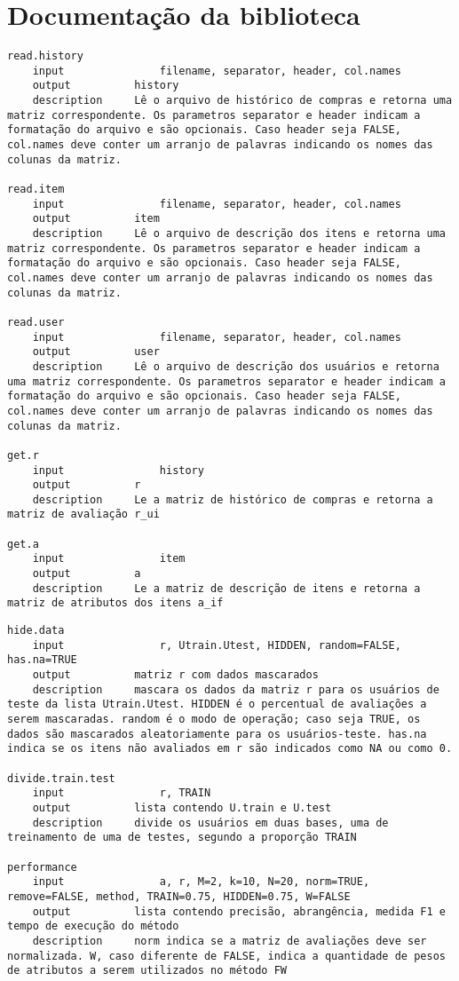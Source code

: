 \chapter{Documentação da biblioteca} %
\label{cha:documenta_o_da_biblioteca}


\begin{lstlisting}[caption=\texttt{setup}.R]
read.history 
	input				filename, separator, header, col.names
	output			history
	description		Lê o arquivo de histórico de compras e retorna uma matriz correspondente. Os parametros separator e header indicam a formatação do arquivo e são opcionais. Caso header seja FALSE, col.names deve conter um arranjo de palavras indicando os nomes das colunas da matriz.

read.item
	input				filename, separator, header, col.names
	output			item
	description		Lê o arquivo de descrição dos itens e retorna uma matriz correspondente. Os parametros separator e header indicam a formatação do arquivo e são opcionais. Caso header seja FALSE, col.names deve conter um arranjo de palavras indicando os nomes das colunas da matriz.

read.user
	input				filename, separator, header, col.names
	output			user
	description		Lê o arquivo de descrição dos usuários e retorna uma matriz correspondente. Os parametros separator e header indicam a formatação do arquivo e são opcionais. Caso header seja FALSE, col.names deve conter um arranjo de palavras indicando os nomes das colunas da matriz.

get.r
	input				history
	output			r
	description		Le a matriz de histórico de compras e retorna a matriz de avaliação r_ui

get.a
	input				item
	output			a
	description		Le a matriz de descrição de itens e retorna a matriz de atributos dos itens a_if
\end{lstlisting}



\begin{lstlisting}[caption=\texttt{performance}.R]
hide.data
	input				r, Utrain.Utest, HIDDEN, random=FALSE, has.na=TRUE 
	output			matriz r com dados mascarados
	description		mascara os dados da matriz r para os usuários de teste da lista Utrain.Utest. HIDDEN é o percentual de avaliações a serem mascaradas. random é o modo de operação; caso seja TRUE, os dados são mascarados aleatoriamente para os usuários-teste. has.na indica se os itens não avaliados em r são indicados como NA ou como 0.

divide.train.test
	input				r, TRAIN
	output			lista contendo U.train e U.test
	description		divide os usuários em duas bases, uma de treinamento de uma de testes, segundo a proporção TRAIN

performance
	input				a, r, M=2, k=10, N=20, norm=TRUE, remove=FALSE, method, TRAIN=0.75, HIDDEN=0.75, W=FALSE
	output			lista contendo precisão, abrangência, medida F1 e tempo de execução do método
	description		norm indica se a matriz de avaliações deve ser normalizada. W, caso diferente de FALSE, indica a quantidade de pesos de atributos a serem utilizados no método FW
\end{lstlisting}


